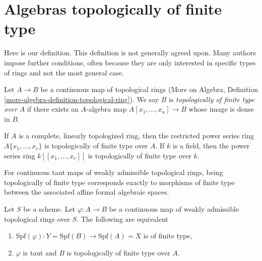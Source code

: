 \section{Algebras topologically of finite type}
\label{section-tft}

\noindent
Here is our definition. This definition is not generally agreed upon.
Many authors impose further conditions, often because they are only
interested in specific types of rings and not the most general case.

\begin{definition}
\label{definition-topologically-finite-type}
Let $A \to B$ be a continuous map of topological rings
(More on Algebra, Definition \ref{more-algebra-definition-topological-ring}).
We say $B$ is {\it topologically of finite type over} $A$ if
there exists an $A$-algebra map $A[x_1, \ldots, x_n] \to B$ whose
image is dense in $B$.
\end{definition}

\noindent
If $A$ is a complete, linearly topologized ring, then the restricted
power series ring $A\{x_1, \ldots, x_r\}$ is topologically of finite
type over $A$. If $k$ is a field, then the power series ring
$k[[x_1, \ldots, x_r]]$ is topologically of finite type over $k$.

\medskip\noindent
For continuous taut maps of weakly admissible topological rings,
being topologically of finite type corresponds exactly to morphisms
of finite type between the associated affine formal algebraic spaces.

\begin{lemma}
\label{lemma-topologically-finite-type-finite-type}
Let $S$ be a scheme. Let $\varphi : A \to B$ be a continuous map of
weakly admissible topological rings over $S$. The following
are equivalent
\begin{enumerate}
\item $\text{Spf}(\varphi) : Y = \text{Spf}(B) \to \text{Spf}(A) = X$
is of finite type,
\item $\varphi$ is taut and $B$ is topologically of finite type over $A$.
\end{enumerate}
\end{lemma}

